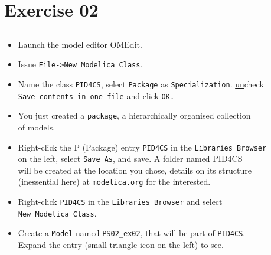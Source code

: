 \section{Exercise 02}
\subsection{}

\begin{frame}
\myPause
 \begin{itemize}[<+-| alert@+>]
 \item Launch the model editor OMEdit.
 \item Issue \texttt{File->New Modelica Class}.
 \item Name the class \texttt{PID4CS}, select \texttt{Package} as \texttt{Specialization}. \underline{un}check\\
       \texttt{Save contents in one file} and click \texttt{OK.}
 \item You just created a \texttt{package}, a hierarchically organised collection\\
       of models.\\
 \item Right-click the P (Package) entry \texttt{PID4CS} in the \texttt{Libraries Browser}\\
       on the left, select \texttt{Save As}, and save. A folder named PID4CS\\
       will be created at the location you chose, details on its structure\\
       (inessential here) at \texttt{modelica.org} for the interested.
 \item Right-click \texttt{PID4CS} in the \texttt{Libraries Browser} and select\\
       \texttt{New Modelica Class}.
 \item Create a \texttt{Model} named \texttt{PS02\_ex02}, that will be part of \texttt{PID4CS}.\\
       Expand the entry (small triangle icon on the left) to see.
 \end{itemize}
\end{frame}

